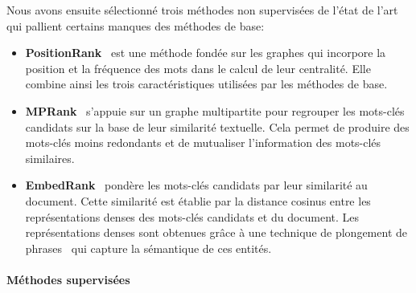 Nous avons ensuite sélectionné trois méthodes non supervisées de l'état de l'art qui pallient certains manques des méthodes de base:
\begin{itemize}
    \item \textbf{PositionRank}~\cite{florescu_positionrank:_2017} est une méthode fondée sur les graphes qui incorpore la position et la fréquence des mots dans le calcul de leur centralité. Elle combine ainsi les trois caractéristiques utilisées par les méthodes de base.
    \item \textbf{MPRank}~\cite{boudin_unsupervised_2018} s'appuie sur un graphe multipartite pour regrouper les mots-clés candidats sur la base de leur similarité textuelle. Cela permet de produire des mots-clés moins redondants et de mutualiser l'information des mots-clés similaires.
    \item \textbf{EmbedRank}~\cite{bennani-smires_simple_2018} pondère les mots-clés candidats par leur similarité au document. Cette similarité est établie par la distance cosinus entre les représentations denses des mots-clés candidats et du document. Les représentations denses sont obtenues grâce à une technique de plongement de phrases~\cite{pagliardini_unsupervised_2018} qui capture la sémantique de ces entités.
    \end{itemize}

\paragraph{Méthodes supervisées}


